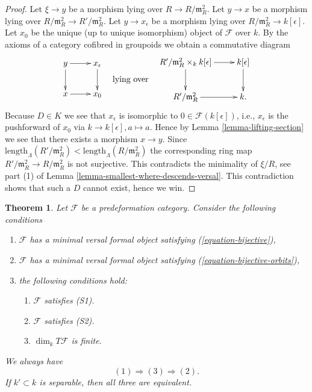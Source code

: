 \documentclass{stacks-project}
\theoremstyle{plain}
\newtheorem{theorem}[subsection]{Theorem}
\theoremstyle{definition}
\theoremstyle{remark}
\numberwithin{equation}{subsection}
\begin{document}
\begin{proof}
\medskip\noindent
Let $\xi \to y$ be a morphism lying over $R \to R/\mathfrak m_R^2$.
Let $y \to x$ be a morphism lying over
$R/\mathfrak m_R^2 \to R'/\mathfrak m_R^2$.
Let $y \to x_\epsilon$ be a morphism lying over
$R/\mathfrak m_R^2 \to k[\epsilon]$. Let $x_0$ be the unique (up to unique
isomorphism) object of $\mathcal{F}$ over $k$.
By the axioms of a category cofibred in groupoids we obtain
a commutative diagram
$$
\vcenter{
\xymatrix{
y \ar[r] \ar[d] & x_\epsilon \ar[d] \\
x \ar[r]   & x_0
}
}
\quad\text{lying over}\quad
\vcenter{
\xymatrix{
R'/\mathfrak m_R^2 \times_k k[\epsilon] \ar[r] \ar[d] & k[\epsilon] \ar[d] \\
R'/\mathfrak m_R^2 \ar[r] & k.
}
}
$$
Because $D \in K$ we see that $x_\epsilon$ is isomorphic
to $0 \in \mathcal{F}(k[\epsilon])$, i.e., $x_\epsilon$ is
the pushforward of $x_0$ via $k \to k[\epsilon], a \mapsto a$.
Hence by
Lemma \ref{lemma-lifting-section}
we see that there exists a morphism $x \to y$. Since
$\text{length}_\Lambda(R'/\mathfrak m_R^2) <
\text{length}_\Lambda(R/\mathfrak m_R^2)$
the corresponding ring map $R'/\mathfrak m_R^2 \to R/\mathfrak m_R^2$
is not surjective. This contradicts the minimality of
$\xi/R$, see part (1) of
Lemma \ref{lemma-smallest-where-descends-versal}.
This contradiction shows that such a $D$ cannot exist, hence
we win.
\end{proof}

\begin{theorem}
\label{theorem-miniversal-object-existence}
Let $\mathcal{F}$ be a predeformation category.
Consider the following conditions
\begin{enumerate}
\item $\mathcal{F}$ has a minimal versal formal object satisfying
(\ref{equation-bijective}),
\item $\mathcal{F}$ has a minimal versal formal object satisfying
(\ref{equation-bijective-orbits}),
\item the following conditions hold:
\begin{enumerate}
\item $\mathcal{F}$ satisfies (S1).
\item $\mathcal{F}$ satisfies (S2).
\item $\dim_k T\mathcal{F}$ is finite.
\end{enumerate}
\end{enumerate}
We always have
$$
(1) \Rightarrow (3) \Rightarrow (2).
$$
If $k' \subset k$ is separable, then all three are equivalent.
\end{theorem}
\end{document}
